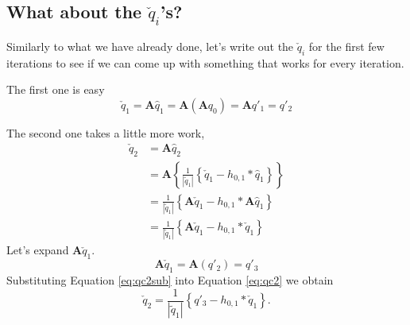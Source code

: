 \documentclass[12pt]{article}
\newcommand{\A}{\mathbf{A}}
\newcommand{\qp}[1]{q'_{#1}}
\newcommand{\qh}[1]{\hat{q}_{#1}}
\newcommand{\qt}[1]{\tilde{q}_{#1}}
\newcommand{\qc}[1]{\check{q}_{#1}}
\newcommand{\Aq}[1]{\A q_{#1}}
\newcommand{\Ap}[1]{\A \qp{#1}}
\newcommand{\Ah}[1]{\A \qh{#1}}
\newcommand{\Ac}[1]{\A \qc{#1}}
\begin{document}
\subsection{What about the $\qc{i}$'s?}
Similarly to what we have already done, let's write out the $\qc{i}$ for the first few iterations to see if we can come up with something that works for every iteration.

The first one is easy
\begin{equation}
    \qc{1} = \Ah{1} = \A \left(\Aq{0}\right) = \Ap{1} = \qp{2}
    \label{eq:qc1}
\end{equation}

The second one takes a little more work,
\begin{subequations}
    \begin{align}
        \qc{2} &= \Ah{2} \\
        &= \A \left\{\frac{1}{\left|\qt{1}\right|} \left\{\qc{1}-h_{0,1}*\qh{1}\right\} \right\} \\
        &= \frac{1}{\left|\qt{1}\right|} \left\{\Ac{1}-h_{0,1}*\Ah{1}\right\} \\
        &= \frac{1}{\left|\qt{1}\right|} \left\{\Ac{1}-h_{0,1}*\qc{1}\right\}
        \label{eq:qc2}
    \end{align}
\end{subequations}
Let's expand $\Ac{1}$.
\begin{equation}
    \Ac{1} = \A \left(\qp{2}\right) = \qp{3}
    \label{eq:qc2sub}
\end{equation}
Substituting Equation \ref{eq:qc2sub} into Equation \ref{eq:qc2} we obtain
\begin{equation}
    \qc{2} = \frac{1}{\left|\qt{1}\right|} \left\{\qp{3}-h_{0,1}*\qc{1}\right\}.
    \label{eq:qc2final}
\end{equation}
\end{document}
